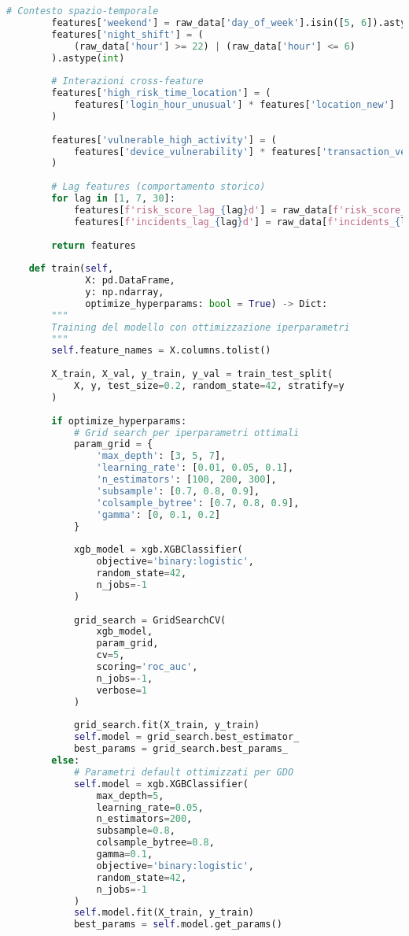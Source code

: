 \begin{lstlisting}[language=Python, caption=Implementazione Risk Scoring adattivo con XGBoost]
        # Contesto spazio-temporale
        features['weekend'] = raw_data['day_of_week'].isin([5, 6]).astype(int)
        features['night_shift'] = (
            (raw_data['hour'] >= 22) | (raw_data['hour'] <= 6)
        ).astype(int)
        
        # Interazioni cross-feature
        features['high_risk_time_location'] = (
            features['login_hour_unusual'] * features['location_new']
        )
        
        features['vulnerable_high_activity'] = (
            features['device_vulnerability'] * features['transaction_velocity']
        )
        
        # Lag features (comportamento storico)
        for lag in [1, 7, 30]:
            features[f'risk_score_lag_{lag}d'] = raw_data[f'risk_score_{lag}d_ago']
            features[f'incidents_lag_{lag}d'] = raw_data[f'incidents_{lag}d_ago']
        
        return features
    
    def train(self, 
              X: pd.DataFrame, 
              y: np.ndarray,
              optimize_hyperparams: bool = True) -> Dict:
        """
        Training del modello con ottimizzazione iperparametri
        """
        self.feature_names = X.columns.tolist()
        
        X_train, X_val, y_train, y_val = train_test_split(
            X, y, test_size=0.2, random_state=42, stratify=y
        )
        
        if optimize_hyperparams:
            # Grid search per iperparametri ottimali
            param_grid = {
                'max_depth': [3, 5, 7],
                'learning_rate': [0.01, 0.05, 0.1],
                'n_estimators': [100, 200, 300],
                'subsample': [0.7, 0.8, 0.9],
                'colsample_bytree': [0.7, 0.8, 0.9],
                'gamma': [0, 0.1, 0.2]
            }
            
            xgb_model = xgb.XGBClassifier(
                objective='binary:logistic',
                random_state=42,
                n_jobs=-1
            )
            
            grid_search = GridSearchCV(
                xgb_model,
                param_grid,
                cv=5,
                scoring='roc_auc',
                n_jobs=-1,
                verbose=1
            )
            
            grid_search.fit(X_train, y_train)
            self.model = grid_search.best_estimator_
            best_params = grid_search.best_params_
        else:
            # Parametri default ottimizzati per GDO
            self.model = xgb.XGBClassifier(
                max_depth=5,
                learning_rate=0.05,
                n_estimators=200,
                subsample=0.8,
                colsample_bytree=0.8,
                gamma=0.1,
                objective='binary:logistic',
                random_state=42,
                n_jobs=-1
            )
            self.model.fit(X_train, y_train)
            best_params = self.model.get_params()
        

\end{lstlisting}
